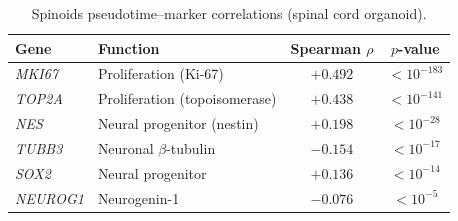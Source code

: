 \documentclass[preprint,12pt,number]{elsarticle}
\begin{document}
\begin{table}[!t]
    \centering
    \caption{Spinoids pseudotime--marker correlations (spinal cord organoid).}
    \label{tab:spinoids_markers}
    \begin{tabular}{llcc}
        \toprule
        Gene & Function & Spearman $\rho$ & $p$-value \\
        \midrule
        \textit{MKI67}   & Proliferation (Ki-67)         & $+0.492$ & $< 10^{-183}$ \\
        \textit{TOP2A}   & Proliferation (topoisomerase)  & $+0.438$ & $< 10^{-141}$ \\
        \textit{NES}     & Neural progenitor (nestin)     & $+0.198$ & $< 10^{-28}$  \\
        \textit{TUBB3}   & Neuronal $\beta$-tubulin       & $-0.154$ & $< 10^{-17}$  \\
        \textit{SOX2}    & Neural progenitor              & $+0.136$ & $< 10^{-14}$  \\
        \textit{NEUROG1} & Neurogenin-1                   & $-0.076$ & $< 10^{-5}$   \\
        \bottomrule
    \end{tabular}
\end{table}



\end{document}
